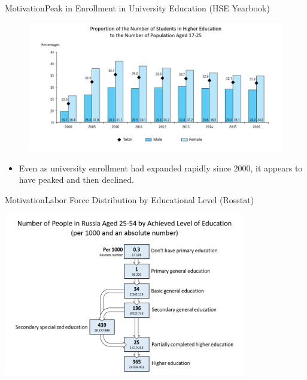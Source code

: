 \documentclass{beamer}
\begin{document}
\begin{frame}{Motivation}{Peak in Enrollment in University Education (HSE Yearbook)}
\begin{figure}
	\centering
	\vspace*{-0.2in}
	\hspace*{-0.3in}
	\includegraphics[width=370pt]{graph_1b.png}
\end{figure}
\begin{itemize}
	\vspace*{-0.3in}
	\item Even as university enrollment had expanded rapidly since 2000, it appears to have peaked and then declined.
\end{itemize}
\end{frame}
	
\begin{frame}{Motivation}{Labor Force Distribution by Educational Level (Rosstat)}
	\begin{center}
		\centering
		\vspace*{-0.2in}
		\includegraphics[width=300pt]{graph_1c.png}
	\end{center}
\end{frame}
\end{document}
